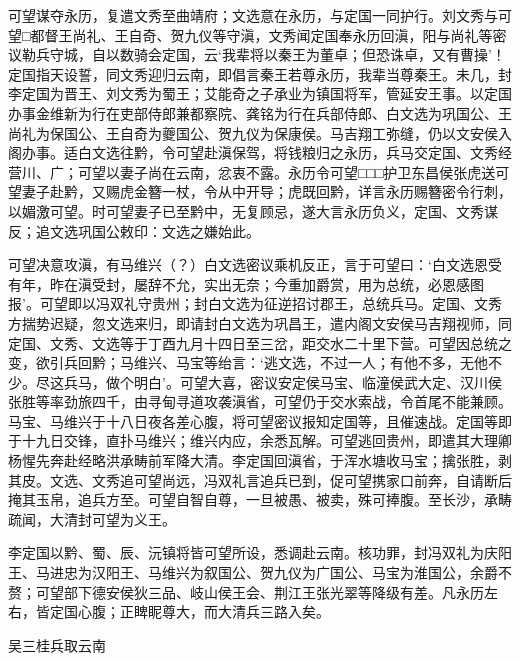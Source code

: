\documentclass[]{article}
\begin{document}
可望谋夺永历，复遣文秀至曲靖府；文选意在永历，与定国一同护行。刘文秀与可望□都督王尚礼、王自奇、贺九仪等守滇，文秀闻定国奉永历回滇，阳与尚礼等密议勒兵守城，自以数骑会定国，云`我辈将以秦王为董卓；但恐诛卓，又有曹操'！定国指天设誓，同文秀迎归云南，即倡言秦王若尊永历，我辈当尊秦王。未几，封李定国为晋王、刘文秀为蜀王；艾能奇之子承业为镇国将军，管延安王事。以定国办事金维新为行在吏部侍郎兼都察院、龚铭为行在兵部侍郎、白文选为巩国公、王尚礼为保国公、王自奇为夔国公、贺九仪为保康侯。马吉翔工弥缝，仍以文安侯入阁办事。适白文选往黔，令可望赴滇保驾，将钱粮归之永历，兵马交定国、文秀经营川、广；可望以妻子尚在云南，忿衷不露。永历令可望□□□护卫东昌侯张虎送可望妻子赴黔，又赐虎金簪一杖，令从中开导；虎既回黔，详言永历赐簪密令行刺，以媚激可望。时可望妻子已至黔中，无复顾忌，遂大言永历负义，定国、文秀谋反；追文选巩国公敕印：文选之嫌始此。

可望决意攻滇，有马维兴（？）白文选密议乘机反正，言于可望曰：`白文选恩受有年，昨在滇受封，屡辞不允，实出无奈；今重加爵赏，用为总统，必恩感图报'。可望即以冯双礼守贵州；封白文选为征逆招讨郡王，总统兵马。定国、文秀方揣势迟疑，忽文选来归，即请封白文选为巩昌王，遣内阁文安侯马吉翔视师，同定国、文秀、文选等于丁酉九月十四日至三岔，距交水二十里下营。可望因总统之变，欲引兵回黔；马维兴、马宝等绐言：`逃文选，不过一人；有他不多，无他不少。尽这兵马，做个明白'。可望大喜，密议安定侯马宝、临潼侯武大定、汉川侯张胜等率劲旅四千，由寻甸寻道攻袭滇省，可望仍于交水索战，令首尾不能兼顾。马宝、马维兴于十八日夜各差心腹，将可望密议报知定国等，且催速战。定国等即于十九日交锋，直扑马维兴；维兴内应，余悉瓦解。可望逃回贵州，即遣其大理卿杨惺先奔赴经略洪承畴前军降大清。李定国回滇省，于浑水塘收马宝；擒张胜，剥其皮。文选、文秀追可望尚远，冯双礼言追兵已到，促可望携家口前奔，自请断后掩其玉帛，追兵方至。可望自智自尊，一旦被愚、被卖，殊可捧腹。至长沙，承畴疏闻，大清封可望为义王。

李定国以黔、蜀、辰、沅镇将皆可望所设，悉调赴云南。核功罪，封冯双礼为庆阳王、马进忠为汉阳王、马维兴为叙国公、贺九仪为广国公、马宝为淮国公，余爵不赘；可望部下德安侯狄三品、岐山侯王会、荆江王张光翠等降级有差。凡永历左右，皆定国心腹；正睥眤尊大，而大清兵三路入矣。

吴三桂兵取云南
\end{document}
